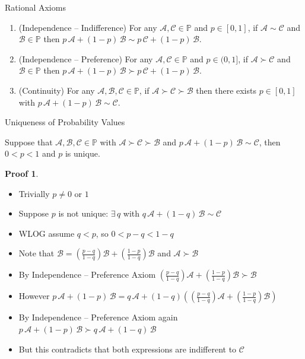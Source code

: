 \documentclass[10pt]{beamer}
\newcommand{\ds}{\displaystyle}
\theoremstyle{definition}
\newtheorem*{prf}{Proof}
\begin{document}
\begin{frame}{Rational Axioms}
\begin{enumerate}[<+->]
  \item (Independence -- Indifference)
    For any $\mathcal{A}, \mathcal{C} \in \mathbb{P}$ and $p \in [0,1]$, if $\mathcal{A} \sim \mathcal{C}$ and $\mathcal{B} \in \mathbb{P}$ then $p\,\mathcal{A} + (1-p)\,\mathcal{B} \sim p\,\mathcal{C} + (1-p)\,\mathcal{B}$.

  \item (Independence -- Preference) 
    For any $\mathcal{A}, \mathcal{C} \in \mathbb{P}$ and $p \in (0,1]$, if $\mathcal{A} \succ \mathcal{C}$ and $\mathcal{B} \in \mathbb{P}$ then $p\,\mathcal{A} + (1-p)\,\mathcal{B} \succ p\,\mathcal{C} + (1-p)\,\mathcal{B}$.

  \item (Continuity) 
    For any $\mathcal{A}, \mathcal{B}, \mathcal{C} \in \mathbb{P}$, if $\mathcal{A} \succ \mathcal{C} \succ \mathcal{B}$ then there exists $p \in [0,1]$ with $p\,\mathcal{A} + (1-p)\,\mathcal{B} \sim \mathcal{C}$.
  \end{enumerate}
\end{frame}

\begin{frame}{Uniqueness of Probability Values}
  \begin{lemma}
    Suppose that $\mathcal{A}, \mathcal{B}, \mathcal{C} \in \mathbb{P}$ with $\mathcal{A} \succ \mathcal{C} \succ \mathcal{B}$ and $p\,\mathcal{A}+(1-p)\,\mathcal{B} \sim \mathcal{C}$, then $0 < p < 1$ and $p$ is unique.
  \end{lemma}
  
  \begin{prf}
    \begin{itemize}[<+->]
      \item Trivially $p \neq 0$ or $1$
      \item Suppose $p$ is not unique: $\exists\,q$ with $q\,\mathcal{A} + (1-q)\,\mathcal{B} \sim \mathcal{C}$
      \item WLOG assume $q < p$, so $0 < p-q < 1-q$
      \item Note that $\mathcal{B} = \left(\frac{p-q}{1-q}\right)\mathcal{B} + \left(\frac{1-p}{1-q}\right)\mathcal{B}$ and $\mathcal{A} \succ \mathcal{B}$
      \item By Independence -- Preference Axiom $\ds\left(\frac{p-q}{1-q}\right)\mathcal{A} + \left(\frac{1-p}{1-q}\right)\mathcal{B} \succ \mathcal{B}$
      \item However $\ds p\,\mathcal{A} + (1-p)\,\mathcal{B} = q\,\mathcal{A} + (1-q)\left(\left(\frac{p-q}{1-q}\right)\mathcal{A} + \left(\frac{1-p}{1-q}\right)\mathcal{B}\right)$
      \item By Independence -- Preference Axiom again $\ds p\,\mathcal{A} + (1-p)\,\mathcal{B} \succ q\,\mathcal{A} + (1-q)\,\mathcal{B}$
      \item But this contradicts that both expressions are indifferent to $\mathcal{C}$
    \end{itemize}
  \end{prf}
\end{frame}
\end{document}
